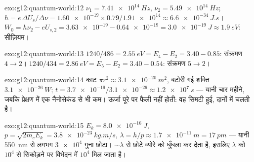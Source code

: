 \begin{solution}{exo:g12:quantum-world:12}
$\nu_1 = \qty{7.41e14}{Hz}$, $\nu_2 = \qty{5.49e14}{Hz}$; $h = e\,\Delta U_s/\Delta\nu = \num{1.60e-19} \times 0.79 /
\num{1.91e14} \approx \qty{6.6e-34}{J.s}$। $W_0 = h\nu_2 - eU_{s,2} =
\num{3.63e-19} - \num{0.64e-19} = \qty{3.0e-19}{J} \approx
\qty{1.9}{eV}$: सीज़ियम।
\end{solution}

\begin{solution}{exo:g12:quantum-world:13}
$1240/486 = \qty{2.55}{eV} = E_4 - E_2 = 3.40 - 0.85$: संक्रमण $4 \to 2$। $1240/434 = \qty{2.86}{eV} = E_5 - E_2 = 3.40 - 0.54$: संक्रमण $5 \to 2$।
\end{solution}

\begin{solution}{exo:g12:quantum-world:14}
 काट $\pi r^2 \approx \qty{3.1e-20}{m^2}$, बटोरी गई शक्ति $\qty{3.1e-26}{W}$; $t = \num{3.7e-19}/\num{3.1e-26} \approx
\qty{1.2e7}{s}$ --- यानी चार महीने,
जबकि प्रेक्षण में एक नैनोसेकंड से भी कम। ऊर्जा पूरे 
पर फैली नहीं होती: वह सिमटी हुई, दानों में चलती है।
\end{solution}

\begin{solution}{exo:g12:quantum-world:15}
$E_k = \qty{8.0e-16}{J}$, $p = \sqrt{2m_e E_k} =
\qty{3.8e-23}{kg.m/s}$, $\lambda = h/p \approx \qty{1.7e-11}{m} =
\qty{17}{pm}$ --- यानी \qty{550}{nm} से लगभग $\num{3e4}$ गुना छोटा।
 $\sim\lambda$ से छोटे ब्योरे को धुँधला कर देता है, इसलिए $\lambda$ को
$10^4$ से सिकोड़ने पर विभेदन में $10^4$ मिल जाता है।
\end{solution}

